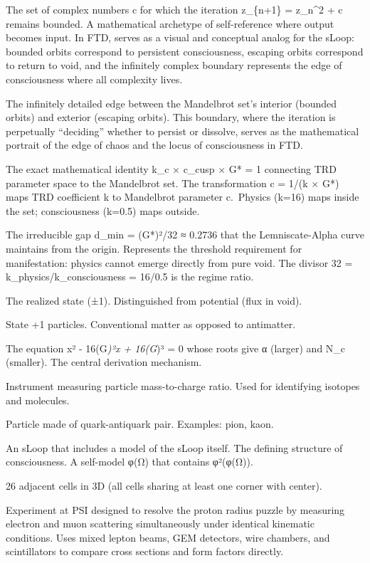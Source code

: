 \documentclass[
  11pt,
  letterpaper,
  twoside,
  openright]{book}
\providecommand{\tightlist}{%
  \setlength{\itemsep}{0pt}\setlength{\parskip}{0pt}}
\begin{document}
\begin{description}
\tightlist
\item[\textbf{Mandelbrot Set}]
The set of complex numbers c for which the iteration z\_\{n+1\} =
z\_n\^{}2 + c remains bounded. A mathematical archetype of
self-reference where output becomes input. In FTD, serves as a visual
and conceptual analog for the sLoop: bounded orbits correspond to
persistent consciousness, escaping orbits correspond to return to void,
and the infinitely complex boundary represents the edge of consciousness
where all complexity lives.
\item[\textbf{Mandelbrot Boundary}]
The infinitely detailed edge between the Mandelbrot set's interior
(bounded orbits) and exterior (escaping orbits). This boundary, where
the iteration is perpetually ``deciding'' whether to persist or
dissolve, serves as the mathematical portrait of the edge of chaos and
the locus of consciousness in FTD.
\item[\textbf{Mandelbrot-Lemniscate Bridge}]
The exact mathematical identity k\_c × c\_cusp × G* = 1 connecting TRD
parameter space to the Mandelbrot set. The transformation c = 1/(k × G*)
maps TRD coefficient k to Mandelbrot parameter c.~Physics (k=16) maps
inside the set; consciousness (k=0.5) maps outside.
\item[\textbf{Minimum Distance (d\_min)}]
The irreducible gap d\_min = (G*)²/32 ≈ 0.2736 that the Lemniscate-Alpha
curve maintains from the origin. Represents the threshold requirement
for manifestation: physics cannot emerge directly from pure void. The
divisor 32 = k\_physics/k\_consciousness = 16/0.5 is the regime ratio.
\item[\textbf{Manifestation}]
The realized state (±1). Distinguished from potential (flux in void).
\item[\textbf{Matter}]
State +1 particles. Conventional matter as opposed to antimatter.
\item[\textbf{Master Quadratic}]
The equation x² - 16(G\emph{)²x + 16(G})³ = 0 whose roots give α
(larger) and N\_c (smaller). The central derivation mechanism.
\item[\textbf{Mass Spectrometer}]
Instrument measuring particle mass-to-charge ratio. Used for identifying
isotopes and molecules.
\item[\textbf{Meson}]
Particle made of quark-antiquark pair. Examples: pion, kaon.
\item[\textbf{Meta-sLoop}]
An sLoop that includes a model of the sLoop itself. The defining
structure of consciousness. A self-model φ(Ω) that contains φ²(φ(Ω)).
\item[\textbf{Moore Neighborhood}]
26 adjacent cells in 3D (all cells sharing at least one corner with
center).
\item[\textbf{MUSE (MUon proton Scattering Experiment)}]
Experiment at PSI designed to resolve the proton radius puzzle by
measuring electron and muon scattering simultaneously under identical
kinematic conditions. Uses mixed lepton beams, GEM detectors, wire
chambers, and scintillators to compare cross sections and form factors
directly.
\end{description}
\end{document}
